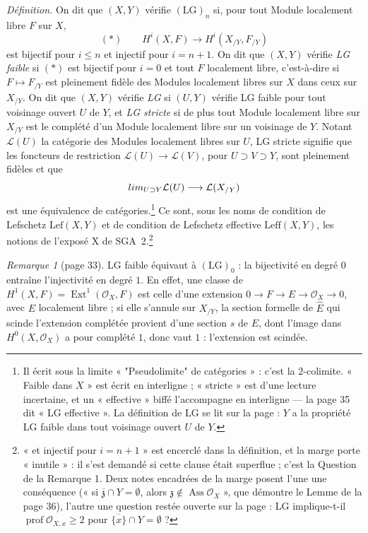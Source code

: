 \documentclass[11pt,a4paper]{article}
\begin{document}
\emph{Définition.} On dit que $(X, Y)$ vérifie $(\mathrm{LG})_n$ si, pour
tout Module localement libre $F$ sur $X$,
\[
  (*) \qquad H^i(X, F) \longrightarrow H^i(X_{/Y}, F_{/Y})
\]
est bijectif pour $i \leq n$ et injectif pour $i = n+1$. On dit que $(X, Y)$
vérifie \emph{LG faible} si $(*)$ est bijectif pour $i = 0$ et tout $F$
localement libre, c'est-à-dire si $F \mapsto F_{/Y}$ est pleinement fidèle des
Modules localement libres sur $X$ dans ceux sur $X_{/Y}$. On dit que $(X, Y)$
vérifie \emph{LG} si $(U, Y)$ vérifie LG faible pour tout voisinage ouvert $U$
de $Y$, et \emph{LG stricte} si de plus tout Module localement libre sur
$X_{/Y}$ est le complété d'un Module localement libre sur un voisinage de $Y$.
Notant $\mathcal{L}(U)$ la catégorie des Modules localement libres sur $U$,
LG stricte signifie que les foncteurs de restriction $\mathcal{L}(U) \to
\mathcal{L}(V)$, pour $U \supset V \supset Y$, sont pleinement fidèles et que
\[
  \varinjlim_{U \supset Y} \mathcal{L}(U) \longrightarrow \mathcal{L}(X_{/Y})
\]
est une équivalence de catégories.\footnote{Il écrit sous la limite
« "Pseudolimite" de catégories » : c'est la $2$-colimite. « Faible dans
$X$ » est écrit en interligne ; « stricte » est d'une lecture incertaine, et
un « effective » biffé l'accompagne en interligne --- la page 35 dit « LG
effective ». La définition de LG se lit sur la page : $Y$ a la propriété LG
faible dans tout voisinage ouvert $U$ de $Y$.} Ce sont,
sous les noms de condition de Lefschetz $\mathrm{Lef}(X, Y)$ et de condition
de Lefschetz effective $\mathrm{Leff}(X, Y)$, les notions de l'exposé X de
SGA~2.\footnote{« et injectif pour $i = n+1$ » est encerclé dans la
définition, et la marge porte « inutile » : il s'est demandé si cette clause
était superflue ; c'est la Question de la Remarque 1. Deux notes encadrées
de la marge posent l'une une conséquence (« si $\overline{\mathfrak{z}} \cap
Y = \emptyset$, alors $\mathfrak{z} \notin \operatorname{Ass}
\mathcal{O}_X$ », que démontre le Lemme de la page 36), l'autre une question
restée ouverte sur la page : LG implique-t-il $\operatorname{prof}
\mathcal{O}_{X,x} \geq 2$ pour $\overline{\lbrace x \rbrace} \cap Y =
\emptyset$ ?}

\emph{Remarque 1} (page 33). LG faible équivaut à $(\mathrm{LG})_0$ : la
bijectivité en degré $0$ entraîne l'injectivité en degré $1$. En effet, une
classe de $H^1(X, F) = \operatorname{Ext}^1(\mathcal{O}_X, F)$ est celle d'une
extension $0 \to F \to E \to \mathcal{O}_X \to 0$, avec $E$ localement libre ;
si elle s'annule sur $X_{/Y}$, la section formelle de $\widehat{E}$ qui scinde
l'extension complétée provient d'une section $s$ de $E$, dont l'image dans
$H^0(X, \mathcal{O}_X)$ a pour complété $1$, donc vaut $1$ : l'extension est
scindée.
\end{document}

